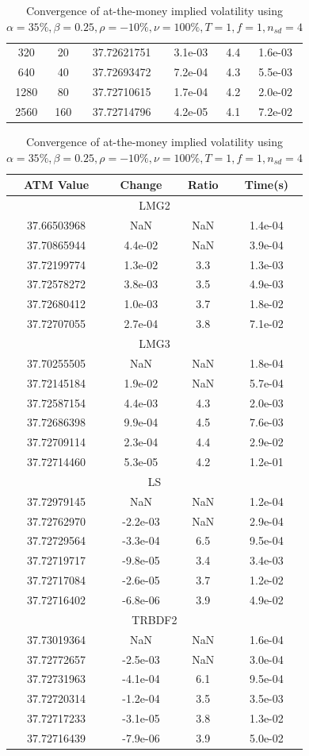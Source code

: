 \documentclass[]{rAMF2e}
\begin{document}
\begin{table}[htb]
\begin{small}
\begin{tabular}{|c|c|c|c|c|c|}
 320 & 20 & 37.72621751 & 3.1e-03 & 4.4 & 1.6e-03\\
 640 & 40 & 37.72693472 & 7.2e-04 & 4.3 & 5.5e-03\\
 1280 & 80 & 37.72710615 & 1.7e-04 & 4.2 & 2.0e-02\\
 2560 & 160 & 37.72714796 & 4.2e-05 & 4.1 & 7.2e-02\\
\hline
\end{tabular}
\begin{tabular}{|c|c|c|c|}
\hline
 ATM Value & Change & Ratio & Time(s)\\
\hline \multicolumn{4}{|c|}{LMG2} \\ \hline
 37.66503968 & NaN & NaN & 1.4e-04\\
 37.70865944 & 4.4e-02 & NaN & 3.9e-04\\
 37.72199774 & 1.3e-02 & 3.3 & 1.3e-03\\
 37.72578272 & 3.8e-03 & 3.5 & 4.9e-03\\
 37.72680412 & 1.0e-03 & 3.7 & 1.8e-02\\
 37.72707055 & 2.7e-04 & 3.8 & 7.1e-02\\
\hline \multicolumn{4}{|c|}{LMG3} \\ \hline
 37.70255505 & NaN & NaN & 1.8e-04\\
 37.72145184 & 1.9e-02 & NaN & 5.7e-04\\
 37.72587154 & 4.4e-03 & 4.3 & 2.0e-03\\
 37.72686398 & 9.9e-04 & 4.5 & 7.6e-03\\
 37.72709114 & 2.3e-04 & 4.4 & 2.9e-02\\
 37.72714460 & 5.3e-05 & 4.2 & 1.2e-01\\
\hline \multicolumn{4}{|c|}{LS} \\ \hline
 37.72979145 & NaN & NaN & 1.2e-04\\
 37.72762970 & -2.2e-03 & NaN & 2.9e-04\\
 37.72729564 & -3.3e-04 & 6.5 & 9.5e-04\\
 37.72719717 & -9.8e-05 & 3.4 & 3.4e-03\\
 37.72717084 & -2.6e-05 & 3.7 & 1.2e-02\\
 37.72716402 & -6.8e-06 & 3.9 & 4.9e-02\\
\hline \multicolumn{4}{|c|}{TRBDF2} \\ \hline
 37.73019364 & NaN & NaN & 1.6e-04\\
 37.72772657 & -2.5e-03 & NaN & 3.0e-04\\
 37.72731963 & -4.1e-04 & 6.1 & 9.5e-04\\
 37.72720314 & -1.2e-04 & 3.5 & 3.5e-03\\
 37.72717233 & -3.1e-05 & 3.8 & 1.3e-02\\
 37.72716439 & -7.9e-06 & 3.9 & 5.0e-02\\
\hline
\end{tabular}
\end{small}
\caption{Convergence of at-the-money implied volatility using $\alpha=35\%, \beta=0.25, \rho=-10\%, \nu=100\%, T=1, f=1, n_{sd}=4$}
\end{table} 
\end{document}
